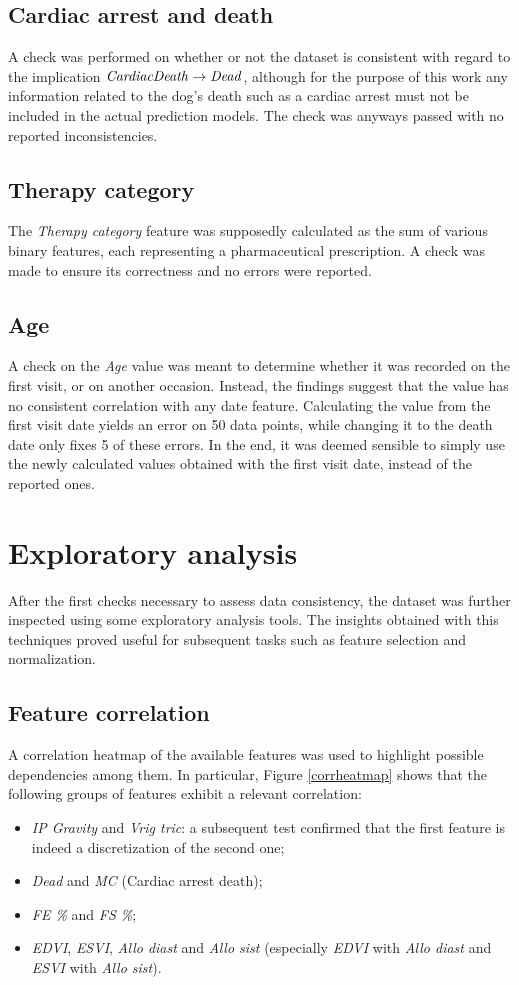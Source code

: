 \documentclass[12pt]{report}
\begin{document}
\subsection*{Cardiac arrest and death}
A check was performed on whether or not the dataset is consistent with regard to the implication $ \text{\emph{CardiacDeath}} \rightarrow \text{\emph{Dead}} $, although for the purpose of this work any information related to the dog's death such as a cardiac arrest must not be included in the actual prediction models. The check was anyways passed with no reported inconsistencies.
\subsection*{Therapy category}
The \textit{Therapy category} feature was supposedly calculated as the sum of various binary features, each representing a pharmaceutical prescription. A check was made to ensure its correctness and no errors were reported.
\subsection*{Age}
A check on the \textit{Age} value was meant to determine whether it was recorded on the first visit, or on another occasion. Instead, the findings suggest that the value has no consistent correlation with any date feature. Calculating the value from the first visit date yields an error on 50 data points, while changing it to the death date only fixes 5 of these errors. In the end, it was deemed sensible to simply use the newly calculated values obtained with the first visit date, instead of the reported ones.

\section{Exploratory analysis} \label{explanal}
After the first checks necessary to assess data consistency, the dataset was further inspected using some exploratory analysis tools. The insights obtained with this techniques proved useful for subsequent tasks such as feature selection and normalization.
\subsection*{Feature correlation}
A correlation heatmap of the available features was used to highlight possible dependencies among them. In particular, Figure \ref{corrheatmap} shows that the following groups of features exhibit a relevant correlation:
\begin{itemize}
\item \textit{IP Gravity} and \textit{Vrig tric}: a subsequent test confirmed that the first feature is indeed a discretization of the second one;
\item \textit{Dead} and \textit{MC} (Cardiac arrest death);
\item \textit{FE \%} and \textit{FS \%};
\item \textit{EDVI}, \textit{ESVI}, \textit{Allo diast} and \textit{Allo sist} (especially \textit{EDVI} with \textit{Allo diast} and \textit{ESVI} with \textit{Allo sist}).
\end{itemize}
\end{document}
